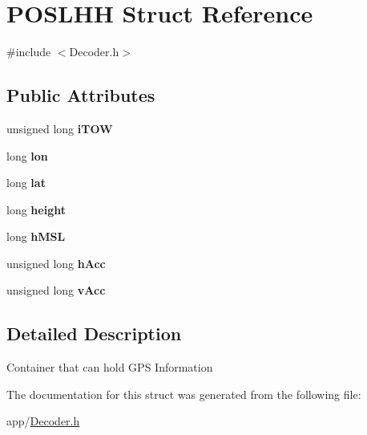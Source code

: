 \hypertarget{struct_p_o_s_l_h_h}{}\section{P\+O\+S\+L\+H\+H Struct Reference}
\label{struct_p_o_s_l_h_h}


{\ttfamily \#include $<$Decoder.\+h$>$}

\subsection*{Public Attributes}
\begin{DoxyCompactItemize}
\item 
\hypertarget{struct_p_o_s_l_h_h_ab9c239ef5138524d3da86faf33d98cc9}{}unsigned long {\bfseries i\+T\+O\+W}\label{struct_p_o_s_l_h_h_ab9c239ef5138524d3da86faf33d98cc9}

\item 
\hypertarget{struct_p_o_s_l_h_h_a7d4c5f7e0e6145b1d2113577ef09e194}{}long {\bfseries lon}\label{struct_p_o_s_l_h_h_a7d4c5f7e0e6145b1d2113577ef09e194}

\item 
\hypertarget{struct_p_o_s_l_h_h_af33f4da0fb978d365fecc7c9965091b6}{}long {\bfseries lat}\label{struct_p_o_s_l_h_h_af33f4da0fb978d365fecc7c9965091b6}

\item 
\hypertarget{struct_p_o_s_l_h_h_a91cc3ec2e312feffd575994e5d6119e2}{}long {\bfseries height}\label{struct_p_o_s_l_h_h_a91cc3ec2e312feffd575994e5d6119e2}

\item 
\hypertarget{struct_p_o_s_l_h_h_a5bb1193c631e7ae5686c73dfa4ab5e11}{}long {\bfseries h\+M\+S\+L}\label{struct_p_o_s_l_h_h_a5bb1193c631e7ae5686c73dfa4ab5e11}

\item 
\hypertarget{struct_p_o_s_l_h_h_a999fa39aae9fe216382402bb2456257c}{}unsigned long {\bfseries h\+Acc}\label{struct_p_o_s_l_h_h_a999fa39aae9fe216382402bb2456257c}

\item 
\hypertarget{struct_p_o_s_l_h_h_a0ce06c98827024e14d23e0a612d21fda}{}unsigned long {\bfseries v\+Acc}\label{struct_p_o_s_l_h_h_a0ce06c98827024e14d23e0a612d21fda}

\end{DoxyCompactItemize}


\subsection{Detailed Description}
Container that can hold G\+P\+S Information 

The documentation for this struct was generated from the following file\+:\begin{DoxyCompactItemize}
\item 
app/\hyperlink{_decoder_8h}{Decoder.\+h}\end{DoxyCompactItemize}
